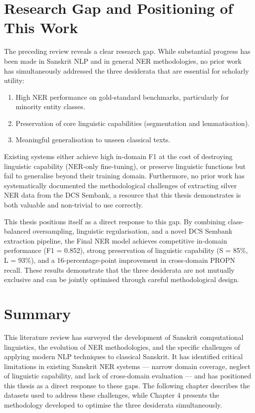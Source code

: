 \section{Research Gap and Positioning of This Work}
\label{sec:research_gap}

The preceding review reveals a clear research gap. While substantial progress has been made in Sanskrit NLP and in general NER methodologies, no prior work has simultaneously addressed the three desiderata that are essential for scholarly utility:

\begin{enumerate}
    \item High NER performance on gold-standard benchmarks, particularly for minority entity classes.
    \item Preservation of core linguistic capabilities (segmentation and lemmatisation).
    \item Meaningful generalisation to unseen classical texts.
\end{enumerate}

Existing systems either achieve high in-domain F1 at the cost of destroying linguistic capability (NER-only fine-tuning), or preserve linguistic functions but fail to generalise beyond their training domain. Furthermore, no prior work has systematically documented the methodological challenges of extracting silver NER data from the DCS Sembank, a resource that this thesis demonstrates is both valuable and non-trivial to use correctly.

This thesis positions itself as a direct response to this gap. By combining class-balanced oversampling, linguistic regularisation, and a novel DCS Sembank extraction pipeline, the Final NER model achieves competitive in-domain performance (F1 = 0.852), strong preservation of linguistic capability (S = 85\%, L = 93\%), and a 16-percentage-point improvement in cross-domain PROPN recall. These results demonstrate that the three desiderata are not mutually exclusive and can be jointly optimised through careful methodological design.

\section{Summary}
\label{sec:summary_lit}

This literature review has surveyed the development of Sanskrit computational linguistics, the evolution of NER methodologies, and the specific challenges of applying modern NLP techniques to classical Sanskrit. It has identified critical limitations in existing Sanskrit NER systems — narrow domain coverage, neglect of linguistic capability, and lack of cross-domain evaluation — and has positioned this thesis as a direct response to these gaps. The following chapter describes the datasets used to address these challenges, while Chapter 4 presents the methodology developed to optimise the three desiderata simultaneously.

